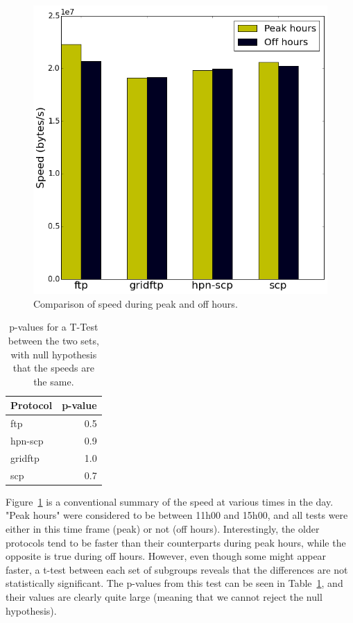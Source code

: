 \documentclass{sig-alternate-05-2015}
\begin{document}
\begin{figure}
\centering
\includegraphics[width=.9\linewidth]{img/peak.png}
\caption{Comparison of speed during peak and off hours.}
\label{fig:peak}
\end{figure}

\begin{table}
\centering
	\begin{tabular}[c]{lr}
	\toprule
	Protocol &  p-value \\
	\midrule
	ftp     &      0.5 \\
	hpn-scp &      0.9 \\
	gridftp &      1.0 \\
	scp     &      0.7 \\
	\bottomrule
	\end{tabular}
\caption{p-values for a T-Test between the two sets, with null hypothesis that the speeds are the same.}
\label{tab:pval}
\end{table}

Figure~\ref{fig:peak} is a conventional summary of the speed at various times in the day. "Peak hours" were considered to be between 11h00 and 15h00, and all tests were either in this time frame (peak) or not (off hours). Interestingly, the older protocols tend to be faster than their counterparts during peak hours, while the opposite is true during off hours. However, even though some might appear faster, a t-test between each set of subgroups reveals that the differences are not statistically significant. The p-values from this test can be seen in Table~\ref{tab:pval}, and their values are clearly quite large (meaning that we cannot reject the null hypothesis).
\end{document}
